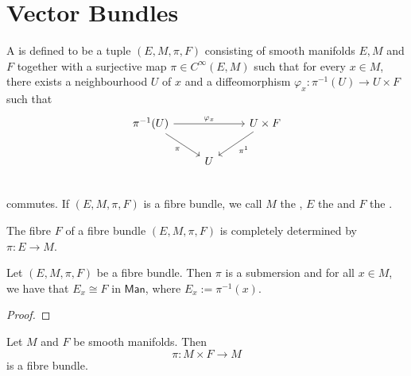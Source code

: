 \section*{Vector Bundles}

\begin{definition}
	A  is defined to be a tuple $(E,M,\pi,F)$ consisting of smooth manifolds $E,M$ and $F$ together with a surjective map $\pi \in C^\infty(E,M)$ such that for every $x \in M$, there exists a neighbourhood $U$ of $x$ and a diffeomorphism $\varphi_x : \pi^{-1}(U) \to U \times F$ such that
	\begin{equation*}
		\begin{tikzcd}
			\pi^{-1}(U) \arrow[dr,"\pi"']\arrow[rr,"\varphi_x"] && U \times F\arrow[dl,"\pi^1"]\\
			& U\\
		\end{tikzcd}
	\end{equation*}
	\noindent commutes. If $(E,M,\pi,F)$ is a fibre bundle, we call $M$ the , $E$ the  and $F$ the .
\end{definition}

The fibre $F$ of a fibre bundle $(E,M,\pi,F)$ is completely determined by $\pi : E \to M$. 

\begin{proposition}
	Let $(E,M,\pi,F)$ be a fibre bundle. Then $\pi$ is a submersion and for all $x \in M$, we have that $E_x \cong F$ in $\mathsf{Man}$, where $E_x := \pi^{-1}(x)$.
\end{proposition}

\begin{proof}
	
\end{proof}

\begin{example}
	Let $M$ and $F$ be smooth manifolds. Then 
	\begin{equation*}
		\pi : M \times F \to M
	\end{equation*}
	\noindent is a fibre bundle.
\end{example}
